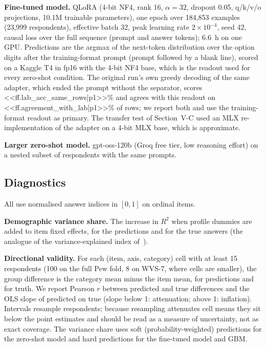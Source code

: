 \documentclass[conference]{IEEEtran}
\begin{document}
\textbf{Fine-tuned model.} QLoRA \cite{dettmers2023,hu2022} (4-bit NF4, rank 16, $\alpha{=}32$, dropout 0.05, q/k/v/o projections, 10.1M trainable parameters), one epoch over 184{,}853 examples (23{,}999 respondents), effective batch 32, peak learning rate $2\times10^{-4}$, seed 42, causal loss over the full sequence (prompt and answer tokens); 6.6~h on one GPU. Predictions are the argmax of the next-token distribution over the option digits after the training-format prompt (prompt followed by a blank line), scored on a Kaggle T4 in fp16 with the 4-bit NF4 base, which is the readout used for every zero-shot condition. The original run's own greedy decoding of the same adapter, which ended the prompt without the separator, scores <<ff.lab_acc_same_rows|p1>>\% and agrees with this readout on <<ff.agreement_with_lab|p1>>\% of rows; we report both and use the training-format readout as primary. The transfer test of Section~V-C used an MLX re-implementation of the adapter on a 4-bit MLX base, which is approximate.

\textbf{Larger zero-shot model.} gpt-oss-120b \cite{gptoss2025} (Groq free tier, low reasoning effort) on a nested subset of respondents with the same prompts.

\subsection{Diagnostics}

All use normalised answer indices in $[0,1]$ on ordinal items.

\textbf{Demographic variance share.} The increase in $R^2$ when profile dummies are added to item fixed effects, for the predictions and for the true answers (the analogue of the variance-explained index of~\cite{chen2026}).

\textbf{Directional validity.} For each (item, axis, category) cell with at least 15 respondents (100 on the full Pew fold, 8 on WVS-7, where cells are smaller), the group difference is the category mean minus the item mean, for predictions and for truth. We report Pearson $r$ between predicted and true differences and the OLS slope of predicted on true (slope below 1: attenuation; above 1: inflation). Intervals resample respondents; because resampling attenuates cell means they sit below the point estimates and should be read as a measure of uncertainty, not as exact coverage. The variance share uses soft (probability-weighted) predictions for the zero-shot model and hard predictions for the fine-tuned model and GBM.
\end{document}
